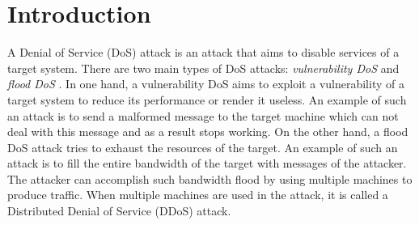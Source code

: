 \section{Introduction}
\label{section:introduction}
A Denial of Service (DoS) attack is an attack that aims to disable services of a target system. There are two main types of DoS attacks: \textit{vulnerability DoS} and \textit{flood DoS} \cite{Lin2013}. In one hand, a vulnerability DoS aims to exploit a vulnerability of a target system to reduce its performance or render it useless. An example of such an attack is to send a malformed message to the target machine which can not deal with this message and as a result stops working. On the other hand, a flood DoS attack tries to exhaust the resources of the target. An example of such an attack is to fill the entire bandwidth of the target with messages of the attacker. The attacker can accomplish such bandwidth flood by using multiple machines to produce traffic. When multiple machines are used in the attack, it is called a Distributed Denial of Service (DDoS) attack.  




